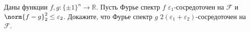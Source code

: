 Даны функции $f, g\colon \{\pm 1\}^n \to \mathbb{R}$. Пусть Фурье спектр $f$ $\varepsilon_1$-сосредоточен
на $\mathcal{F}$ и $\norm{f - g}_2^2 \le \varepsilon_2$. Докажите, что Фурье спектр $g$
$2 (\varepsilon_1 + \varepsilon_2)$-сосредоточен на $\mathcal{F}$.

